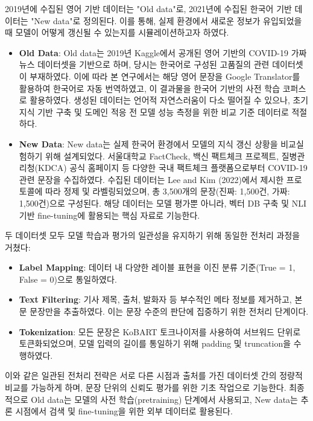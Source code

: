 \documentclass[a4paper,fleqn]{cas-sc}
\begin{document}
2019년에 수집된 영어 기반 데이터는 "Old data"로, 2021년에 수집된 한국어 기반 데이터는 "New data"로 정의된다. 
이를 통해, 실제 환경에서 새로운 정보가 유입되었을 때 모델이 어떻게 갱신될 수 있는지를 시뮬레이션하고자 하였다.

\begin{itemize}
    \item{\textbf{Old Data}:
    Old data는 2019년 Kaggle에서 공개된 영어 기반의 COVID-19 가짜 뉴스 데이터셋을 기반으로 하며, 당시는 한국어로 구성된 고품질의 관련 데이터셋이 부재하였다.  
    이에 따라 본 연구에서는 해당 영어 문장을 Google Translator를 활용하여 한국어로 자동 번역하였고, 이 결과물을 한국어 기반의 사전 학습 코퍼스로 활용하였다.  
    생성된 데이터는 언어적 자연스러움이 다소 떨어질 수 있으나, 초기 지식 기반 구축 및 도메인 적응 전 모델 성능 측정을 위한 비교 기준 데이터로 적절하다.}
    \item{\textbf{New Data}:
    New data는 실제 한국어 환경에서 모델의 지식 갱신 상황을 비교실험하기 위해 설계되었다.  
    서울대학교 FactCheck, 백신 팩트체크 프로젝트, 질병관리청(KDCA) 공식 홈페이지 등 다양한 국내 팩트체크 플랫폼으로부터 COVID-19 관련 문장을 수집하였다.  
    수집된 데이터는 Lee and Kim (2022)에서 제시한 프로토콜에 따라 정제 및 라벨링되었으며, 총 3,500개의 문장(진짜: 1,500건, 가짜: 1,500건)으로 구성된다.  
    해당 데이터는 모델 평가뿐 아니라, 벡터 DB 구축 및 NLI 기반 fine-tuning에 활용되는 핵심 자료로 기능한다.}
    
\end{itemize}  
두 데이터셋 모두 모델 학습과 평가의 일관성을 유지하기 위해 동일한 전처리 과정을 거쳤다:

\begin{itemize}
    \item{\textbf{Label Mapping}:
    데이터 내 다양한 레이블 표현을 이진 분류 기준(True = 1, False = 0)으로 통일하였다.}
    \item{\textbf{Text Filtering}:
    기사 제목, 출처, 발화자 등 부수적인 메타 정보를 제거하고, 본문 문장만을 추출하였다.  
    이는 문장 수준의 판단에 집중하기 위한 전처리 단계이다.}
    \item{\textbf{Tokenization}: 
    모든 문장은 KoBART 토크나이저를 사용하여 서브워드 단위로 토큰화되었으며, 모델 입력의 길이를 통일하기 위해 padding 및 truncation을 수행하였다.
    }
\end{itemize}  

이와 같은 일관된 전처리 전략은 서로 다른 시점과 출처를 가진 데이터셋 간의 정량적 비교를 가능하게 하며, 문장 단위의 신뢰도 평가를 위한 기초 작업으로 기능한다.  
최종적으로 Old data는 모델의 사전 학습(pretraining) 단계에서 사용되고, New data는 추론 시점에서 검색 및 fine-tuning을 위한 외부 데이터로 활용된다.
\end{document}
